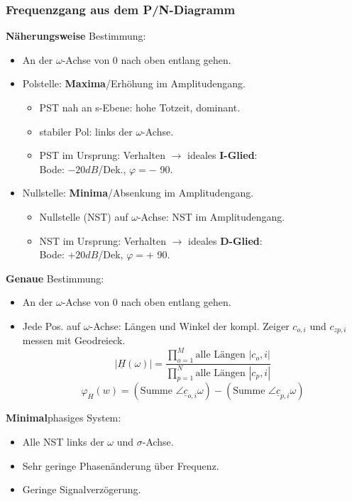 \subsubsection{Frequenzgang aus dem P/N-Diagramm}
\textbf{Näherungsweise} Bestimmung:
\begin{itemize}
\item An der $\omega$-Achse von 0 nach oben entlang gehen.
\item Polstelle: \textbf{Maxima}/Erhöhung im Amplitudengang.
\begin{itemize}
	\item PST nah an s-Ebene: hohe Totzeit, dominant.
	\item stabiler Pol: links der $\omega$-Achse.
	\item PST im Ursprung: Verhalten $\rightarrow$ ideales \textbf{I-Glied}:\\ Bode: $-20dB$/Dek., $\varphi=-$ 90\textdegree.
\end{itemize}
\item Nullstelle: \textbf{Minima}/Absenkung im Amplitudengang.
\begin{itemize}
	\item Nullstelle (NST) auf $\omega$-Achse: NST im Amplitudengang.
	\item NST im Ursprung: Verhalten $\rightarrow$ ideales \textbf{D-Glied}:\\ Bode: $+20dB$/Dek, $ \varphi=+$ 90\textdegree.
\end{itemize}

\end{itemize}
\textbf{Genaue} Bestimmung:
\begin{itemize}
	\item An der $\omega$-Achse von 0 nach oben entlang gehen.
	\item Jede Pos. auf $\omega$-Achse: Längen und Winkel der kompl. Zeiger $c_{o,i}$ und $c_{zp,i}$ messen mit Geodreieck.
	\[
	|\underline{H}(\omega)|=\frac{\prod_{o=1}^{M}\text{alle Längen } |c_o,i|}{\prod_{p=1}^{N}\text{alle Längen } |c_p,i|}
	\]
	\[
	\varphi_H(w)=(\text{Summe } \angle \underline{c}_{o,i}{\omega})-(\text{Summe } \angle \underline{c}_{p,i}{\omega})
	\]
\end{itemize}
\textbf{Minimal}phasiges System:
\begin{itemize}
	\item Alle NST links der $\omega$ und $\sigma$-Achse.
	\item Sehr geringe Phasen\"anderung \"uber Frequenz.
	\item Geringe Signalverz\"ogerung.
\end{itemize}

